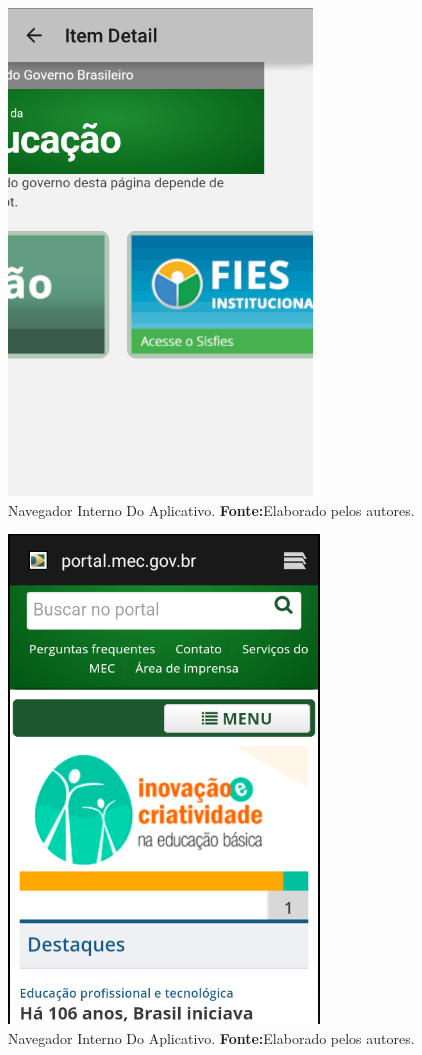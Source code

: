 \begin{figure}[h!]
	\centerline{\includegraphics[scale=0.5]{./imagens/3_discussao_resultados/dr2.png}}
	\caption[Navegador Interno Do Aplicativo]{Navegador Interno Do Aplicativo.
		\textbf{Fonte:}Elaborado pelos autores.}
	\label{fig:dr2}
\end{figure}
\pagebreak	

\begin{figure}[h!]
	\centerline{\includegraphics[scale=0.5]{./imagens/3_discussao_resultados/dr3.png}}
	\caption[Navegador Interno Do Aplicativo]{Navegador Interno Do Aplicativo.
		\textbf{Fonte:}Elaborado pelos autores.}
	\label{fig:dr3}
\end{figure}
\pagebreak	

